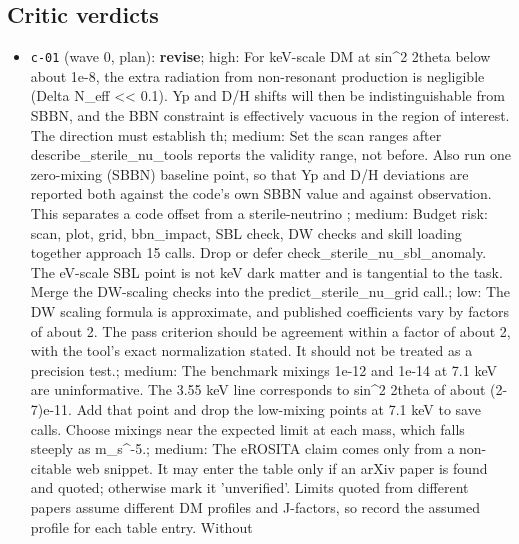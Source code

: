 \documentclass[11pt,a4paper]{article}
\begin{document}
\subsection{Critic verdicts}
\begin{itemize}
  \item \texttt{c-01} (wave 0, plan): \textbf{revise}; high: For keV-scale DM at sin\textasciicircum{}2 2theta below about 1e-8, the extra radiation from non-resonant production is negligible (Delta N\_eff \textless{}\textless{} 0.1). Yp and D/H shifts will then be indistinguishable from SBBN, and the BBN constraint is effectively vacuous in the region of interest. The direction must establish th; medium: Set the scan ranges after describe\_sterile\_nu\_tools reports the validity range, not before. Also run one zero-mixing (SBBN) baseline point, so that Yp and D/H deviations are reported both against the code's own SBBN value and against observation. This separates a code offset from a sterile-neutrino ; medium: Budget risk: scan, plot, grid, bbn\_impact, SBL check, DW checks and skill loading together approach 15 calls. Drop or defer check\_sterile\_nu\_sbl\_anomaly. The eV-scale SBL point is not keV dark matter and is tangential to the task. Merge the DW-scaling checks into the predict\_sterile\_nu\_grid call.; low: The DW scaling formula is approximate, and published coefficients vary by factors of about 2. The pass criterion should be agreement within a factor of about 2, with the tool's exact normalization stated. It should not be treated as a precision test.; medium: The benchmark mixings 1e-12 and 1e-14 at 7.1 keV are uninformative. The 3.55 keV line corresponds to sin\textasciicircum{}2 2theta of about (2-7)e-11. Add that point and drop the low-mixing points at 7.1 keV to save calls. Choose mixings near the expected limit at each mass, which falls steeply as m\_s\textasciicircum{}-5.; medium: The eROSITA claim comes only from a non-citable web snippet. It may enter the table only if an arXiv paper is found and quoted; otherwise mark it 'unverified'. Limits quoted from different papers assume different DM profiles and J-factors, so record the assumed profile for each table entry. Without 

\end{itemize}
\end{document}
